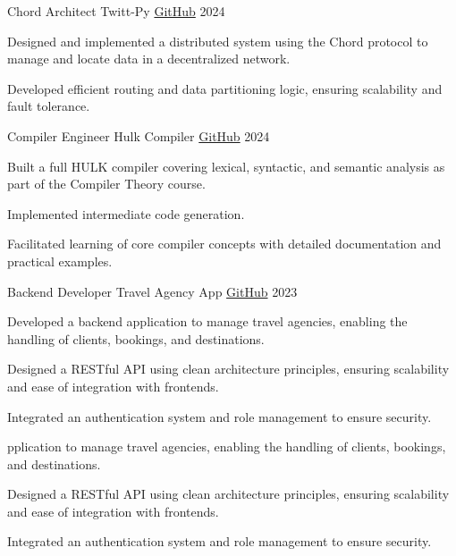 \begin{cventries}
{\begin{cvitems}
{\begin{cventries}
            \cventry
            {Chord Architect}
            {Twitt-Py}
            {\href{https://github.com/alexsierra45/twitt-py}{GitHub}}
            {2024}
            {
              \begin{cvitems}
                \item {Designed and implemented a distributed system using the Chord protocol to manage and locate data in a decentralized network.}
                \item {Developed efficient routing and data partitioning logic, ensuring scalability and fault tolerance.}
              \end{cvitems}
            }
          \cventry
            {Compiler Engineer}
            {Hulk Compiler}
            {\href{https://github.com/alexsierra45/hulk-compiler}{GitHub}}
            {2024}
            {
              \begin{cvitems}
                \item {Built a full HULK compiler covering lexical, syntactic, and semantic analysis as part of the Compiler Theory course.}
                \item {Implemented intermediate code generation.}
                \item {Facilitated learning of core compiler concepts with detailed documentation and practical examples.}
              \end{cvitems}
            }
        
            \cventry
            {Backend Developer}
            {Travel Agency App}
            {\href{https://github.com/alexsierra45/travel-agency}{GitHub}}
            {2023}
            {
              \begin{cvitems}
                \item {Developed a backend application to manage travel agencies, enabling the handling of clients, bookings, and destinations.}
                \item {Designed a RESTful API using clean architecture principles, ensuring scalability and ease of integration with frontends.}
                \item {Integrated an authentication system and role management to ensure security.}
              \end{cvitems}
            }
        \end{cventries}
        pplication to manage travel agencies, enabling the handling of clients, bookings, and destinations.}
        \item {Designed a RESTful API using clean architecture principles, ensuring scalability and ease of integration with frontends.}
        \item {Integrated an authentication system and role management to ensure security.}
      \end{cvitems}
    }
\end{cventries}
